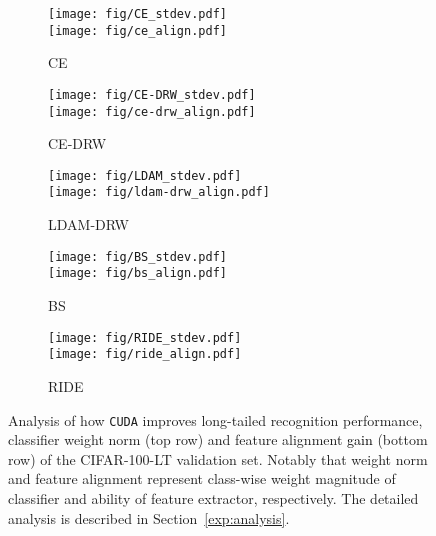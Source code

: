 \documentclass{article}
\def\code#1{\texttt{#1}}
\newcommand{\alg}{\code{CUDA}\xspace}
\newcommand{\rebut}[1]{\textcolor{black}{#1}}
\begin{document}
\vspace{-3pt}
\begin{figure}[!t]
  \centering
  \begin{subfigure}{0.195\linewidth}
\texttt{[image: fig/CE\_stdev.pdf]}\\
            \texttt{[image: fig/ce\_align.pdf]}
            \vspace{-15pt}
          \caption{CE}
  \end{subfigure}
  \begin{subfigure}{0.195\linewidth}
\texttt{[image: fig/CE-DRW\_stdev.pdf]}\\
            \texttt{[image: fig/ce-drw\_align.pdf]}
            \vspace{-15pt}
          \caption{CE-DRW}
  \end{subfigure}
  \begin{subfigure}{0.195\linewidth}
\texttt{[image: fig/LDAM\_stdev.pdf]}\\
            \texttt{[image: fig/ldam-drw\_align.pdf]}
            \vspace{-15pt}
          \caption{LDAM-DRW}
  \end{subfigure}
  \begin{subfigure}{0.195\linewidth}
\texttt{[image: fig/BS\_stdev.pdf]}\\
            \texttt{[image: fig/bs\_align.pdf]}
            \vspace{-15pt}
          \caption{BS}
  \end{subfigure}
  \begin{subfigure}{0.195\linewidth}
\texttt{[image: fig/RIDE\_stdev.pdf]}\\
            \texttt{[image: fig/ride\_align.pdf]}
            \vspace{-15pt}
          \caption{RIDE}
  \end{subfigure}
  \vspace{-7pt}
  \caption{Analysis of how \alg improves long-tailed recognition performance, classifier weight norm (top row) and feature alignment \rebut{gain} (bottom row) of the CIFAR-100-LT validation set. Notably that weight norm and feature alignment represent class-wise weight magnitude of classifier and ability of feature extractor, respectively. The detailed analysis is described in Section~\ref{exp:analysis}.}
  \vspace{-7pt}
  \label{fig:output_analysis}
\end{figure}
\end{document}

